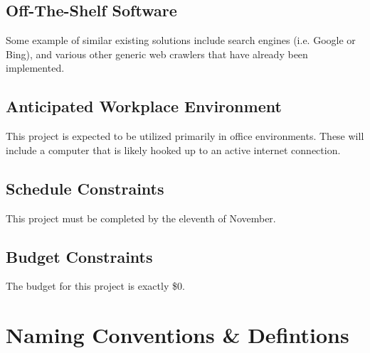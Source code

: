 \documentclass[titlepage]{article}
\begin{document}
\subsection*{Off-The-Shelf Software}
Some example of similar existing solutions include search engines (i.e. Google or Bing), and various other generic web crawlers that have already been implemented.

\subsection*{Anticipated Workplace Environment}
This project is expected to be utilized primarily in office environments. These will include a computer that is likely hooked up to an active internet connection.

\subsection*{Schedule Constraints}
This project must be completed by the eleventh of November.

\subsection*{Budget Constraints}
The budget for this project is exactly \$0.


\section{Naming Conventions \& Defintions}
\end{document}
